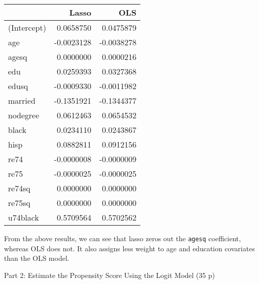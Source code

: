 \documentclass[
]{article}
\begin{document}
\begin{enumerate}
  \begin{longtable}[]{@{}lrr@{}}
  \toprule\noalign{}
  & Lasso & OLS \\
  \midrule\noalign{}
  \endhead
  \bottomrule\noalign{}
  \endlastfoot
  (Intercept) & 0.0658750 & 0.0475879 \\
  age & -0.0023128 & -0.0038278 \\
  agesq & 0.0000000 & 0.0000216 \\
  edu & 0.0259393 & 0.0327368 \\
  edusq & -0.0009330 & -0.0011982 \\
  married & -0.1351921 & -0.1344377 \\
  nodegree & 0.0612463 & 0.0654532 \\
  black & 0.0234110 & 0.0243867 \\
  hisp & 0.0882811 & 0.0912156 \\
  re74 & -0.0000008 & -0.0000009 \\
  re75 & -0.0000025 & -0.0000025 \\
  re74sq & 0.0000000 & 0.0000000 \\
  re75sq & 0.0000000 & 0.0000000 \\
  u74black & 0.5709564 & 0.5702562 \\
  \end{longtable}

  From the above results, we can see that lasso zeros out the
  \texttt{agesq} coefficient, whereas OLS does not. It also assigns less
  weight to age and education covariates than the OLS model.
\end{enumerate}

\begin{center}
{\LARGE Part 2: Estimate the Propensity Score Using the Logit Model (35 p)}
\end{center}

\noindent 
\end{document}
